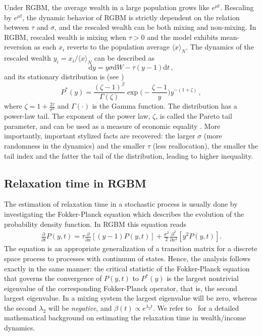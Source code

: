 \documentclass[11pt]{article}
\newcommand{\be}{\begin{equation}}
\newcommand{\ee}{\end{equation}}
\numberwithin{equation}{section}
\begin{document}
Under RGBM, the average wealth in a large population grows like $e^{\mu t}$. Rescaling by $e^{\mu t}$, the dynamic behavior of RGBM is strictly dependent on the relation between $\tau$ and $\sigma$, and the rescaled wealth can be both mixing and non-mixing. In RGBM, rescaled wealth is mixing when $\tau > 0$
and the model exhibits mean-reversion as each $x_i$ reverts to the population average $\langle x \rangle_N$. The dynamics of the rescaled wealth $y_i = x_i / \langle x \rangle_N$ can be described as
%
\be
    \mathrm{d} y =   y \sigma  \mathrm{d} W - \tau (y - 1)  \mathrm{d}t\,,
    \label{eq:rescaled-rgbm}
\ee
%
and its stationary distribution is (see \citep{BermanPetersAdamou2019})
%
\be
P^*(y) = \frac{(\zeta - 1)^{\beta}}{\Gamma(\zeta)} \exp{\big(-\frac{\zeta - 1}{y}\big)} y^{-(1+\zeta)}\,,
\label{eq:rgbm-stationary-distribution}
\ee
%
where $\zeta = 1 + \frac{2 \tau}{\sigma^2}$ and $\Gamma(\cdot)$ is the Gamma function. The distribution has a power-law tail. The exponent of the power law, $\zeta$, is called the Pareto tail parameter, and can be used as a measure of economic equality \citep{Cowell2011}. More importantly, important stylized facts are recovered: the larger $\sigma$ (more randomness in the dynamics) and the smaller $\tau$ (less reallocation), the smaller the tail index and the fatter the tail of the distribution, leading to higher inequality.

\subsection{Relaxation time in RGBM}
\label{sec:relax-time-rgbm}
The estimation of relaxation time in a stochastic process is usually done by investigating the Fokker-Planck equation which describes the evolution of the probability density function. In RGBM this equation reads
\begin{align}
       \frac{\partial}{\partial t}P(y,t)= \tau \frac{\partial}{\partial x} \left[(y-1) P(y,t)\right] + \frac{\sigma^2}{2}\frac{\partial^2}{\partial x^2} \left[ y^2 P(y,t) \right].
\end{align}
The equation is an appropriate generalization of a transition matrix for a discrete space process to processes with continuum of states. Hence, the analysis follows exactly in the same manner: the critical statistic of the Fokker-Planck equation that governs the convergence of $P(y,t)$ to $P^*(y)$ is the largest nontrivial eigenvalue of the corresponding Fokker-Planck operator, that is, the second largest eigenvalue. In a mixing system the largest eigenvalue will be zero, whereas the second $\lambda_2$ will be \textit{negative}, and $\beta(t) \propto e^{\lambda_2 t}$. We refer to~\cite{gabaix2016dynamics} for a detailed mathematical background on estimating the relaxation time in wealth/income dynamics. 
\end{document}
